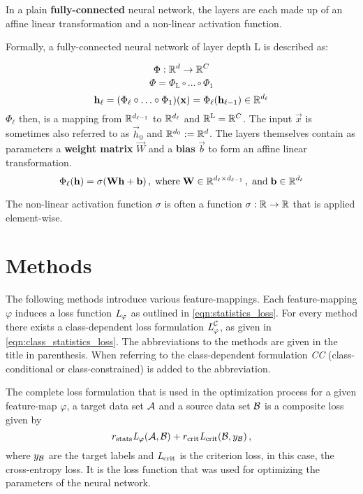 In a plain \textbf{fully-connected} neural network, the layers are each made up of an affine linear transformation and a non-linear activation function.

Formally, a fully-connected neural network of layer depth L is described as:

\[
    \Phi : \mathbb{R}^d \to \mathbb{R}^C
\]
\[
    \Phi = \Phi_\text{L} \circ \ldots \circ \Phi_1
\]
\[
    \mathbf h_\ell = (\Phi_\ell \circ \ldots \circ \Phi_1) (\mathbf x) =
    \Phi_\ell(\mathbf h_{\ell-1}) \in \mathbb{R}^{d_\ell}
\]
$\Phi_\ell$ then, is a mapping from $\mathbb{R}^{d_{\ell-1}}$ to $\mathbb{R}^{d_\ell}$ and $\mathbb{R}^{\textnormal L} = \mathbb{R}^C$.
The input $\vec x$ is sometimes also referred to as $\vec h_0$ and $\mathbb{R}^{d_0} := \mathbb{R}^d$.
The layers themselves contain as parameters a \textbf{weight matrix} $\vec W$ and a \textbf{bias} $\vec b$
to form an affine linear transformation.
\[
    \Phi_\ell(\mathbf h) = \sigma (\mathbf W \mathbf h + \mathbf b) \,, \; \text{where} \;
    \mathbf W \in \mathbb{R}^{d_\ell \times d_{\ell-1}} \,, \; \text{and} \;
    \mathbf b \in \mathbb{R}^{d_\ell}
\]

The non-linear activation function $\sigma$ is often a function $\sigma:\mathbb{R}\to\mathbb{R}$ that is applied element-wise.



\section{Methods}
\label{sec:methods}

The following methods introduce various feature-mappings.
Each feature-mapping $\varphi$ induces a loss function $\textit{L}_\varphi$ as outlined in \ref{eqn:statistics_loss}.
For every method there exists a class-dependent loss formulation $\textit{L}_\varphi^{\mathcal C}$,
as given in \ref{eqn:class_statistics_loss}.
The abbreviations to the methods are given in the title in parenthesis. 
When referring to the class-dependent formulation \textit{CC} (class-conditional or
class-constrained) is added to the abbreviation.

The complete loss formulation that is used in the optimization process 
for a given feature-map $\varphi$, a target data set $\mathcal A$ and a source data set $\mathcal B$ 
is a composite loss given by
\[
    r_\text{stats}\textit{L}_\varphi(\mathcal A, \mathcal B) + r_\text{crit}\textit{L}_\text{crit}(\mathcal B, y_{\mathcal B}) \,,
\]
where $y_{\mathcal B}$ are the target labels and $\textit{L}_\text{crit}$ is the criterion loss, in this case, the cross-entropy loss.
It is the loss function that was used for optimizing the parameters of the neural network.



